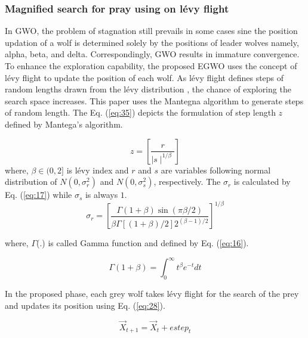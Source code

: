 \documentclass[review]{elsarticle}
\begin{document}
               \subsubsection{Magnified search for pray using on l\'{e}vy flight} \label{sec:levy}
  
In GWO, the problem of stagnation still prevails in some cases sine the position updation of a wolf is determined solely by the positions of leader wolves namely, alpha, beta, and delta. Correspondingly, GWO results in immature convergence. To enhance the exploration capability, the proposed EGWO uses the concept of l\'{e}vy flight to update the position of each wolf. As l\'{e}vy flight defines steps of random lengths drawn from the l\'{e}vy distribution \cite{shlesinger1995levy}, the chance of exploring the search space increases. This paper uses the Mantegna algorithm \cite{yang2010eagle} to generate steps of random length. The Eq. (\ref{eq:35}) depicts the formulation of step length $z$ defined by Mantega's algorithm.
             
         \begin{equation}\label{eq:35}
               z= \left[  \frac{r}{\mid s \mid ^{1/ \beta}} \right]
\end{equation}    
             where, $\beta \in (0,2]$ is l\'{e}vy index and $r$ and $s$ are variables following normal distribution of  $N(0, \sigma_{r}^2)$ and $N(0, \sigma_{s}^2)$, respectively. The  $\sigma_r$ is calculated by Eq. (\ref{eq:17}) while  $\sigma_s$ is  always $1$. 
 \begin{equation}\label{eq:17}
               \sigma_r=	\left[ \frac{ \Gamma(1+\beta)\sin(\pi\beta/2)  }   { \beta\Gamma[(1+\beta)/2]2^{(\beta-1)/2} } \right] ^{1/\beta}
        \end{equation} 

where, $\Gamma$(.) is called Gamma function and defined by Eq. (\ref{eq:16}).

        \begin{equation}\label{eq:16}
                  \Gamma(1+\beta)= \int_{0}^{\infty} t^\beta e^{-t} dt                     
        \end{equation} 

        In the proposed phase, each grey wolf takes l\'{e}vy flight for the search of the prey and updates its position using Eq. (\ref{eq:28}).   
     
                                                  \begin{equation}\label{eq:28}
                                                   \overrightarrow X_{t+1}=\overrightarrow X_t+estep_t
                                                \end{equation}
\end{document}
